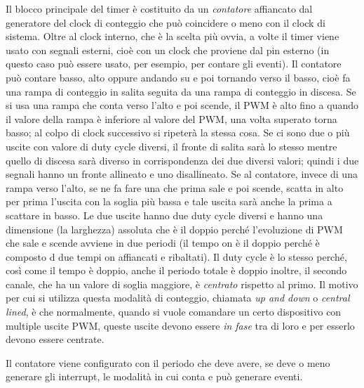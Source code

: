 \documentclass[12pt, a4paper]{report}
\begin{document}
Il blocco principale del timer è costituito da un \textit{contatore} affiancato dal generatore del clock di conteggio che può coincidere o meno con il clock di sistema. Oltre al clock interno, che è la scelta più ovvia, a volte il timer viene usato con segnali esterni, cioè con un clock che proviene dal pin esterno (in questo caso può essere usato, per esempio, per contare gli eventi). Il contatore può contare basso, alto oppure andando su e poi tornando verso il basso, cioè fa una rampa di conteggio in salita seguita da una rampa di conteggio in discesa. Se si usa una rampa che conta verso l'alto e poi scende, il PWM è alto fino a quando il valore della rampa è inferiore al valore del PWM, una volta superato torna basso; al colpo di clock successivo si ripeterà la stessa cosa. Se ci sono due o più uscite con valore di duty cycle diversi, il fronte di salita sarà lo stesso mentre quello di discesa sarà diverso in corrispondenza dei due diversi valori; quindi i due segnali hanno un fronte allineato e uno disallineato. Se al contatore, invece di una rampa verso l'alto, se ne fa fare una che prima sale e poi scende, scatta in alto per prima l'uscita con la soglia più bassa e tale uscita sarà anche la prima a scattare in basso. Le due uscite hanno due duty cycle diversi e hanno una dimensione (la larghezza) assoluta che è il doppio perché l'evoluzione di PWM che sale e scende avviene in due periodi (il tempo on è il doppio perché è composto d due tempi on affiancati e ribaltati). Il duty cycle è lo stesso perché, così come il tempo è doppio, anche il periodo totale è doppio inoltre, il secondo canale, che ha un valore di soglia maggiore, è \textit{centrato} rispetto al primo. Il motivo per cui si utilizza questa modalità di conteggio, chiamata \textit{up and down} o \textit{central lined}, è che normalmente, quando si vuole comandare un certo dispositivo con multiple uscite PWM, queste uscite devono essere \textit{in fase} tra di loro e per esserlo devono essere centrate.

Il contatore viene configurato con il periodo che deve avere, se deve o meno generare gli interrupt, le modalità in cui conta e può generare eventi.
\end{document}
